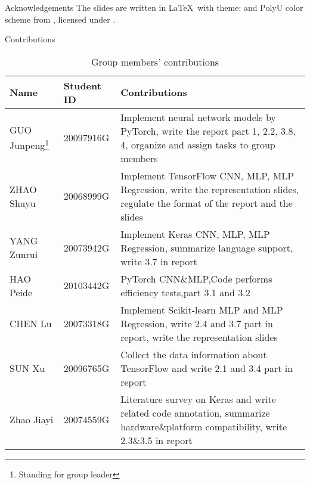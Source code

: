 \documentclass[10pt]{beamer}
\newcommand{\MYhref}[3][polyuseventyfivered]{\href{#2}{\color{#1}{#3}}}%
\begin{document}
\begin{frame}{Acknowledgements}
    The slides are written in \LaTeX \ with theme: \MYhref{https://github.com/matze/mtheme}{Metropolis} and PolyU color scheme from \MYhref{https://github.com/quxiaofeng/PolyU_beamer_theme}{Prof. Qu Xiaofeng}, licensed under \MYhref{http://creativecommons.org/licenses/by-sa/4.0/}{Creative Commons
  Attribution-ShareAlike 4.0 International License}.

  \begin{center}\ccbysa\end{center}

\end{frame}

\begin{frame}{Contributions}
\begin{table}[h!]
\begin{center}
\begin{tabularx}{11cm}{p{2.8cm}p{1.8cm}X}
\toprule  
Name & Student ID & Contributions \\
\midrule   
GUO Junpeng\footnote{Standing for group leader} & 20097916G & \tiny{Implement neural network models by PyTorch, write the report part 1, 2.2, 3.8, 4, organize and assign tasks to group members}\\
ZHAO Shuyu & 20068999G & \tiny{Implement TensorFlow CNN, MLP, MLP Regression, write the representation slides, regulate the format of the report and the slides} \\
YANG Zunrui & 20073942G & \tiny{Implement Keras CNN, MLP, MLP Regression, summarize language support, write 3.7 in report} \\
HAO Peide & 20103442G & \tiny{PyTorch CNN\&MLP,Code performs efficiency tests,part 3.1 and 3.2} \\
CHEN Lu & 20073318G &   \tiny{Implement Scikit-learn MLP and MLP Regression, write 2.4 and 3.7 part in report, write the representation slides}\\
SUN Xu & 20096765G &  \tiny{Collect the data information about TensorFlow and write 2.1 and 3.4 part in report}\\
Zhao Jiayi & 20074559G &  \tiny{Literature survey on Keras and write related code annotation, summarize hardware\&platform compatibility, write 2.3\&3.5 in report}\\
\bottomrule
\end{tabularx}
\caption{Group members' contributions}
\end{center}
\end{table}



\end{frame}
\end{document}
